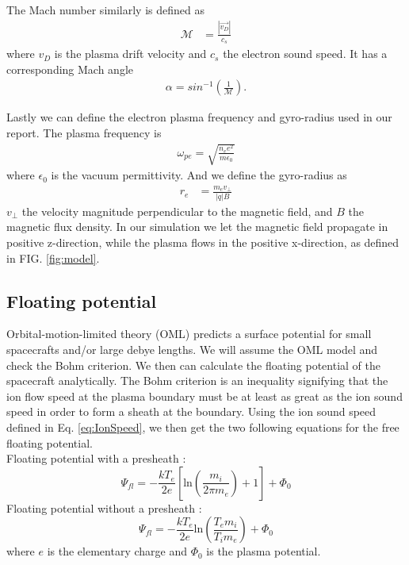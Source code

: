 \documentclass[aip, 
rsi, 
amsmath,
amssymb,
longbibliography,
reprint]{revtex4-1}
\begin{document}
The Mach number similarly is defined as
\begin{align}
\mathcal{M} &= \frac{|\vec{v_D}|}{c_s}\label{eq:Mach}
\end{align}
where $v_D$ is the plasma drift velocity and $c_s$ the electron sound speed. It has a corresponding Mach angle
\begin{align}
\alpha = sin^{-1}(\frac{1}{\mathcal{M}})\label{eq:MachAngle}.
\end{align}

Lastly we can define the electron plasma frequency and gyro-radius used in our report. The plasma frequency is
\begin{align}
\omega_{pe} = \sqrt{\frac{n_e e^2}{m \epsilon_0}}\label{plasmafreq}
\end{align}
where $\epsilon_0$ is the vacuum permittivity. And we define the gyro-radius as 
\begin{align}
r_e &= \frac{m_e v_\perp}{|q| B}\label{eq:gyroradius}
\end{align}
$v_\perp$ the velocity magnitude perpendicular to the magnetic field, and $B$ the magnetic flux density. In our simulation we let the magnetic field propagate in positive z-direction, while the plasma flows in the positive x-direction, as defined in FIG. \ref{fig:model}.

\subsection{Floating potential}

Orbital-motion-limited theory (OML) predicts a surface potential for small spacecrafts and/or large debye lengths. We will assume the OML model and check the Bohm criterion. We then can calculate the floating potential of the spacecraft analytically. The Bohm criterion is an inequality signifying that the ion flow speed at the plasma boundary must be at least as great as the ion sound speed in order to form a sheath at the boundary.  Using the ion sound speed defined in Eq. \ref{eq:IonSpeed}, we then get the two following equations for the free floating potential. \\

Floating potential with a presheath \cite{Boef}:
\begin{equation}\label{eq:Boef}
\Psi_{fl} = -\frac{k T_e}{2e}[\text{ln}(\frac{m_i}{2\pi m_e})+1]+\Phi_0
\end{equation}
Floating potential without a presheath \cite{Pesceli}:
\begin{equation}\label{eq:Pesceli}
\Psi_{fl}=-\frac{k T_e}{2e}\text{ln}(\frac{T_em_i}{T_i m_e})+\Phi_0
\end{equation}
where $e$ is the elementary charge and $\Phi_0$ is the plasma potential. \\
\end{document}
